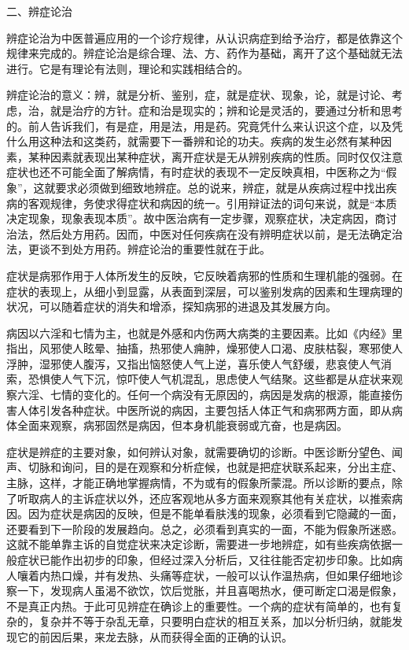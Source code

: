 \documentclass[12pt,UTF8]{ctexbook}
\begin{document}
二、辨症论治

辨症论治为中医普遍应用的一个诊疗规律，从认识病症到给予治疗，都是依靠这个规律来完成的。辨症论治是综合理、法、方、药作为基础，离开了这个基础就无法进行。它是有理论有法则，理论和实践相结合的。

辨症论治的意义：辨，就是分析、鉴别，症，就是症状、现象，论，就是讨论、考虑，治，就是治疗的方针。症和治是现实的；辨和论是灵活的，要通过分析和思考的。前人告诉我们，有是症，用是法，用是药。究竟凭什么来认识这个症，以及凭什么用这种法和这类药，就需要下一番辨和论的功夫。疾病的发生必然有某种因素，某种因素就表现出某种症状，离开症状是无从辨别疾病的性质。同时仅仅注意症状也还不可能全面了解病情，有时症状的表现不一定反映真相，中医称之为“假象”，这就要求必须做到细致地辨症。总的说来，辨症，就是从疾病过程中找出疾病的客观规律，务使求得症状和病因的统一。引用辩证法的词句来说，就是“本质决定现象，现象表现本质”。故中医治病有一定步骤，观察症状，决定病因，商讨治法，然后处方用药。因而，中医对任何疾病在没有辨明症状以前，是无法确定治法，更谈不到处方用药。辨症论治的重要性就在于此。

症状是病邪作用于人体所发生的反映，它反映着病邪的性质和生理机能的强弱。在症状的表现上，从细小到显露，从表面到深层，可以鉴别发病的因素和生理病理的状况，可以随着症状的消失和增添，探知病邪的进退及其发展方向。

病因以六淫和七情为主，也就是外感和内伤两大病类的主要因素。比如《内经》里指出，风邪使人眩晕、抽搐，热邪使人痈肿，燥邪使人口渴、皮肤枯裂，寒邪使人浮肿，湿邪使人腹泻，又指出恼怒使人气上逆，喜乐使人气舒缓，悲哀使人气消索，恐惧使人气下沉，惊吓使人气机混乱，思虑使人气结聚。这些都是从症状来观察六淫、七情的变化的。任何一个病没有无原因的，病因是发病的根源，能直接伤害人体引发各种症状。中医所说的病因，主要包括人体正气和病邪两方面，即从病体全面来观察，病邪固然是病因，但本身机能衰弱或亢奋，也是病因。

症状是辨症的主要对象，如何辨认对象，就需要确切的诊断。中医诊断分望色、闻声、切脉和询问，目的是在观察和分析症候，也就是把症状联系起来，分出主症、主脉，这样，才能正确地掌握病情，不为或有的假象所蒙混。所以诊断的要点，除了听取病人的主诉症状以外，还应客观地从多方面来观察其他有关症状，以推索病因。因为症状是病因的反映，但是不能单看肤浅的现象，必须看到它隐藏的一面，还要看到下一阶段的发展趋向。总之，必须看到真实的一面，不能为假象所迷惑。这就不能单靠主诉的自觉症状来决定诊断，需要进一步地辨症，如有些疾病依据一般症状已能作出初步的印象，但经过深入分析后，又往往能否定初步印象。比如病人嚷着内热口燥，并有发热、头痛等症状，一般可以认作温热病，但如果仔细地诊察一下，发现病人虽渴不欲饮，饮后觉胀，并且喜喝热水，便可断定口渴是假象，不是真正内热。于此可见辨症在确诊上的重要性。一个病的症状有简单的，也有复杂的，复杂并不等于杂乱无章，只要明白症状的相互关系，加以分析归纳，就能发现它的前因后果，来龙去脉，从而获得全面的正确的认识。
\end{document}
